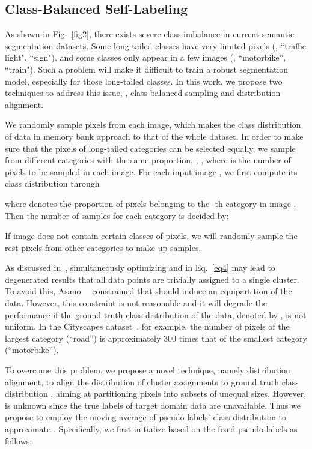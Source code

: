 \documentclass[10pt,twocolumn,letterpaper]{article}
\begin{document}
	\subsection{Class-Balanced Self-Labeling}
	\label{sec3.3}
	As shown in Fig.~\ref{fig2}, there exists severe class-imbalance in current semantic segmentation datasets. Some long-tailed classes have very limited pixels (\eg, ``traffic light", ``sign"), and some classes only appear in a few images (\eg, ``motorbike'', ``train"). Such a problem will make it difficult to train a robust segmentation model, especially for those long-tailed classes. In this work, we propose two techniques to address this issue, \ie, class-balanced sampling and distribution alignment.
	
	\vspace{0.5em} 
	We randomly sample pixels from each image, which makes the class distribution of data in memory bank  approach to that of the whole dataset. In order to make sure that the pixels of long-tailed categories can be selected equally, we sample from different categories with the same proportion, \ie, , where  is the number of pixels to be sampled in each image. For each input image , we first compute its class distribution  through 
	
	where  denotes the proportion of pixels belonging to the -th category in image . Then the number of samples  for each category  is decided by: 
	 
	If image  does not contain certain classes of pixels, we will randomly sample the rest pixels from other categories to make up  samples.
	
	\vspace{0.5em} 
	As discussed in~\cite{asano2020self,caron2018deep}, simultaneously optimizing  and  in Eq.~\ref{eq4} may lead to degenerated results that all data points are trivially assigned to a single cluster. To avoid this, Asano~\etal~\cite{asano2020self} constrained that  should induce an equipartition of the data. However, this constraint is not reasonable and it will degrade the performance if the ground truth class distribution of the data, denoted by , is not uniform. In the Cityscapes dataset~\cite{cordts2016cityscapes}, for example, the number of pixels of the largest category (``road'') is approximately 300 times that of the smallest category (``motorbike''). 
	
	To overcome this problem, we propose a novel technique, namely distribution alignment, to align the distribution of cluster assignments to ground truth class distribution , aiming at partitioning pixels into subsets of unequal sizes. However,  is unknown since the true labels of target domain data are unavailable. Thus we propose to employ the moving average of pseudo labels' class distribution  to approximate . Specifically, we first initialize  based on the fixed pseudo labels  as follows:
	
\end{document}
